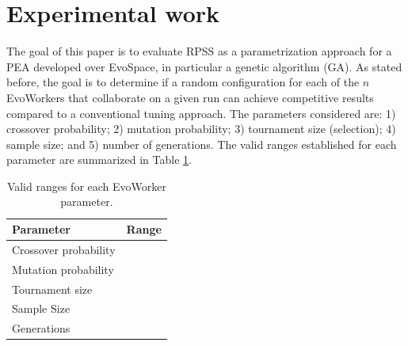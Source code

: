 \documentclass{sig-alternate}
\begin{document}

\section{Experimental work}
\label{sec:experiments}
The goal of this paper is to evaluate RPSS as a parametrization approach for a PEA developed over EvoSpace,
in particular a genetic algorithm (GA).
As stated before, the goal is to determine if a random configuration for each of the $n$ EvoWorkers that collaborate on a given run
can achieve competitive results compared to a conventional tuning approach.
The parameters considered are: 1) crossover probability; 2) mutation probability; 3) tournament size (selection); 4) sample size;
and 5) number of generations.
The valid ranges established for each parameter are summarized in Table \ref{tab:params}.

\begin{table}[!t]
\caption{Valid ranges for each EvoWorker parameter.}
\label{tab:params}
\centering
\begin{tabular}{|l|c|}
\hline
\textbf{Parameter} & \textbf{Range} \\
\hline
\hline
Crossover probability & \\
Mutation probability & \\
Tournament size & \\
Sample Size & \\
Generations & \\
\hline
\end{tabular}
\end{table}
\end{document}
